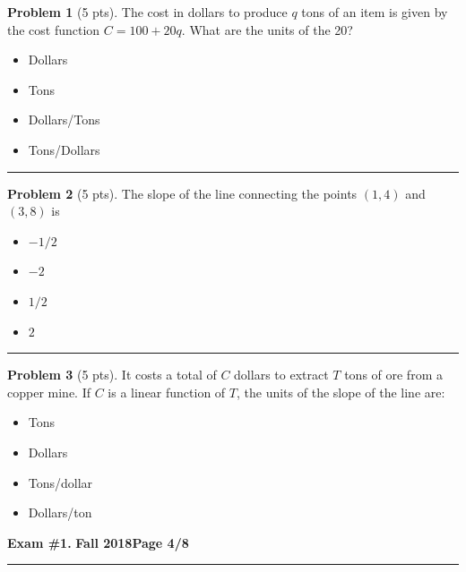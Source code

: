 \documentclass[12pt]{article}
\makeatletter
\theoremstyle{definition}
\newtheorem{problem}{Problem}
\newcommand*{\radiobutton}{%
  \@ifstar{\@radiobutton0}{\@radiobutton1}%
}
\newcommand*{\@radiobutton}[1]{%
  \begin{tikzpicture}
    \pgfmathsetlengthmacro\radius{height("X")/2}
    \draw[radius=\radius] circle;
    \ifcase#1 \fill[radius=.6*\radius] circle;\fi
  \end{tikzpicture}%
}
\makeatother
\begin{document}
\begin{problem}[5 pts]
The cost in dollars to produce $q$ tons of an item is given by the cost function $C = 100 + 20q$. What are the units of the 20?
\begin{itemize}
\item[\radiobutton] Dollars
\item[\radiobutton] Tons
\item[\radiobutton] Dollars/Tons
\item[\radiobutton] Tons/Dollars
\end{itemize} 
\end{problem}
\hrule

\begin{problem}[5 pts]
The slope of the line connecting the points $(1, 4)$ and $(3, 8)$ is
\begin{itemize}
\item[\radiobutton] $-1/2$
\item[\radiobutton] $-2$
\item[\radiobutton] $1/2$
\item[\radiobutton] $2$
\end{itemize}
\end{problem}
\hrule

\begin{problem}[5 pts]
It costs a total of $C$ dollars to extract $T$ tons of ore from a copper mine. If $C$ is a linear function of $T$, the units of the slope of the line are:
\begin{itemize}
\item[\radiobutton] Tons
\item[\radiobutton] Dollars
\item[\radiobutton] Tons/dollar
\item[\radiobutton] Dollars/ton
\end{itemize}
\end{problem}

\newpage

\hfill{\large\bf Exam \#1.}\hfill{\large\bf
  Fall 2018}\hfill{\large\bf Page 4/8}\hrule
\end{document}
